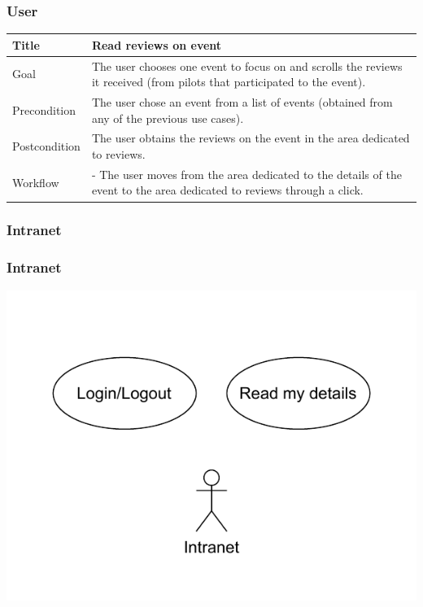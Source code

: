 \documentclass{beamer}
\begin{document}
\begin{frame}
    \frametitle{User}
    \begin{table}
        \tiny
        \begin{tabular}{|p{2cm}|p{6cm}|}
        \hline  
        Title & \textbf{Read reviews on event} \\
        \hline
        Goal & The user chooses one event to focus on and scrolls the reviews it received (from pilots that 
        participated to the event). \\
        \hline
        Precondition & The user chose an event from a list of events (obtained from any of the previous use cases).\\
        \hline
        Postcondition & The user obtains the reviews on the event in the area dedicated to reviews. \\
        \hline
        Workflow &
        - The user moves from the area dedicated to the details of the event to the
        area dedicated to reviews through a click. \\
        \hline
        \end{tabular}
\end{table}
\end{frame}





% 
% 
% 
% 
% 
% 
% 
% 

\subsubsection{Intranet}

\begin{frame}
    \frametitle{Intranet}
    \centering
    \includegraphics[width=0.7\linewidth]{drawio/intranet.pdf}
\end{frame}
\end{document}
